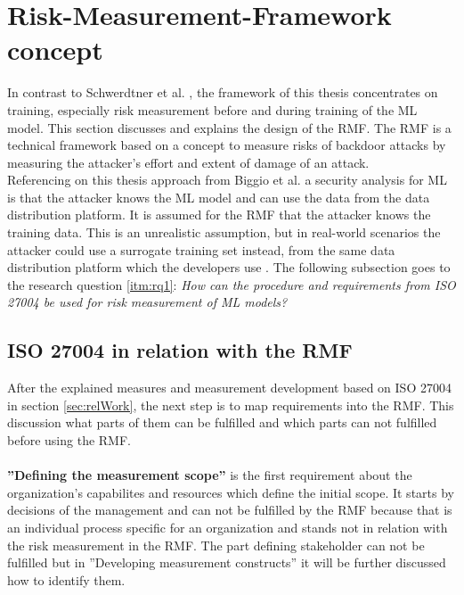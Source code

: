 
\section{Risk-Measurement-Framework concept}
\label{sec:conFrame}

In contrast to Schwerdtner et al. \cite{DBLP:journals/corr/abs-2011-04328}, the framework of this thesis concentrates on training, especially risk measurement before and during training of the ML model. This section discusses and explains the design of the RMF. The RMF is a technical framework based on a concept to measure risks of backdoor attacks \cite{DBLP:conf/eusipco/ArshadAQLY21} by measuring the attacker's effort and extent of damage of an attack. \\ Referencing on this thesis approach from Biggio et al. \cite{DBLP:conf/icml/BiggioNL12} a security analysis for ML is that the attacker knows the ML model and can use the data from the data distribution platform. It is assumed for the RMF that the attacker knows the training data. This is an unrealistic assumption, but in real-world scenarios the attacker could use a surrogate training set instead, from the same data distribution platform which the developers use \cite{DBLP:journals/ml/BarrenoNJT10}. The following subsection goes to the research question \ref{itm:rq1}: \textit{How can the procedure and requirements from ISO 27004 be used for risk measurement of ML models?}

\subsection{ISO 27004 in relation with the RMF}
\label{sec:standard}

After the explained measures and measurement development based on ISO 27004 in section \ref{sec:relWork}, the next step is to map requirements into the RMF. This discussion what parts of them can be fulfilled and which parts can not fulfilled before using the RMF. \\ \\

\textbf{''Defining the measurement scope''} is the first requirement about the organization's capabilites and resources which define the initial scope. It starts by decisions of the management and can not be fulfilled by the RMF because that is an individual process specific for an organization and stands not in relation with the risk measurement in the RMF. The part defining stakeholder can not be fulfilled but in ''Developing measurement constructs'' it will be further discussed how to identify them.  \\ \\

